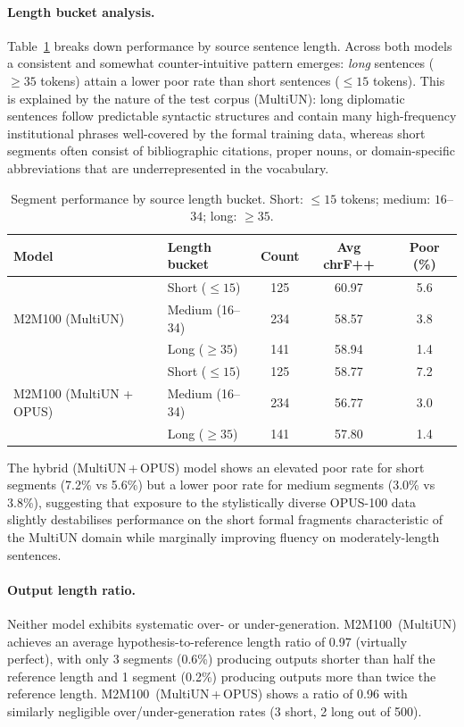\documentclass{article}
\begin{document}
	\paragraph{Length bucket analysis.}
	Table~\ref{tab:error_len} breaks down performance by source sentence length. Across both
	models a consistent and somewhat counter-intuitive pattern emerges: \emph{long}
	sentences ($\geq 35$ tokens) attain a lower poor rate than short sentences ($\leq 15$
	tokens). This is explained by the nature of the test corpus (MultiUN): long diplomatic
	sentences follow predictable syntactic structures and contain many high-frequency
	institutional phrases well-covered by the formal training data, whereas short segments
	often consist of bibliographic citations, proper nouns, or domain-specific abbreviations
	that are underrepresented in the vocabulary.
	\begin{table}[h]
		\caption{Segment performance by source length bucket. Short: $\leq 15$ tokens;
			medium: $16$--$34$; long: $\geq 35$.}
		\label{tab:error_len}
		\centering
		\small
		\begin{tabular}{llccc}
			\toprule
			\textbf{Model} & \textbf{Length bucket} & \textbf{Count} & \textbf{Avg chrF++} & \textbf{Poor (\%)} \\
			\midrule
			\multirow{3}{*}{M2M100 (MultiUN)}
			& Short  ($\leq 15$) & 125 & 60.97 & 5.6 \\
			& Medium (16--34)     & 234 & 58.57 & 3.8 \\
			& Long   ($\geq 35$) & 141 & 58.94 & 1.4 \\
			\midrule
			\multirow{3}{*}{M2M100 (MultiUN + OPUS)}
			& Short  ($\leq 15$) & 125 & 58.77 & 7.2 \\
			& Medium (16--34)     & 234 & 56.77 & 3.0 \\
			& Long   ($\geq 35$) & 141 & 57.80 & 1.4 \\
			\bottomrule
		\end{tabular}
	\end{table}
	
	The hybrid (MultiUN\,+\,OPUS) model shows an elevated poor rate for short segments (7.2\%
	vs 5.6\%) but a lower poor rate for medium segments (3.0\% vs 3.8\%), suggesting that
	exposure to the stylistically diverse OPUS-100 data slightly destabilises performance on the
	short formal fragments characteristic of the MultiUN domain while marginally improving
	fluency on moderately-length sentences.
	
	\paragraph{Output length ratio.}
	Neither model exhibits systematic over- or under-generation. M2M100~(MultiUN) achieves
	an average hypothesis-to-reference length ratio of 0.97 (virtually perfect), with only 3
	segments (0.6\%) producing outputs shorter than half the reference length and 1 segment
	(0.2\%) producing outputs more than twice the reference length. M2M100~(MultiUN\,+\,OPUS)
	shows a ratio of 0.96 with similarly negligible over/under-generation rates (3 short, 2
	long out of 500).
	
\end{document}

